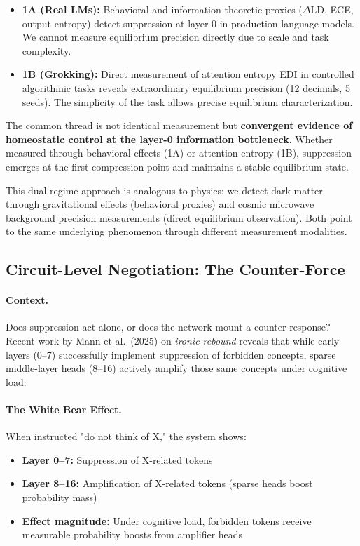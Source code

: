 \begin{itemize}
\item \textbf{1A (Real LMs):} Behavioral and information-theoretic proxies ($\Delta$LD, ECE, output entropy) detect suppression at layer 0 in production language models. We cannot measure equilibrium precision directly due to scale and task complexity.

\item \textbf{1B (Grokking):} Direct measurement of attention entropy EDI in controlled algorithmic tasks reveals extraordinary equilibrium precision (12 decimals, 5 seeds). The simplicity of the task allows precise equilibrium characterization.
\end{itemize}

The common thread is not identical measurement but \textbf{convergent evidence of homeostatic control at the layer-0 information bottleneck}. Whether measured through behavioral effects (1A) or attention entropy (1B), suppression emerges at the first compression point and maintains a stable equilibrium state.

This dual-regime approach is analogous to physics: we detect dark matter through gravitational effects (behavioral proxies) and cosmic microwave background precision measurements (direct equilibrium observation). Both point to the same underlying phenomenon through different measurement modalities.

\subsection{Circuit-Level Negotiation: The Counter-Force}

\paragraph{Context.}
Does suppression act alone, or does the network mount a counter-response? Recent work by Mann et al.~(2025) on \emph{ironic rebound} reveals that while early layers (0--7) successfully implement suppression of forbidden concepts, sparse middle-layer heads (8--16) actively amplify those same concepts under cognitive load.

\paragraph{The White Bear Effect.}
When instructed "do not think of X," the system shows:
\begin{itemize}
\item \textbf{Layer 0--7:} Suppression of X-related tokens
\item \textbf{Layer 8--16:} Amplification of X-related tokens (sparse heads boost probability mass)
\item \textbf{Effect magnitude:} Under cognitive load, forbidden tokens receive measurable probability boosts from amplifier heads
\end{itemize}

